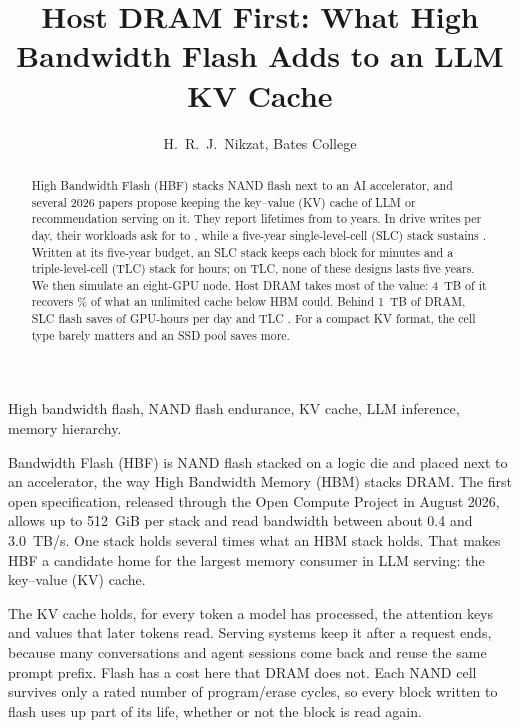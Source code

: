 \documentclass[journal]{IEEEtran}
\begin{document}

\title{Host DRAM First: What High Bandwidth Flash Adds to an LLM KV Cache}

\author{H.~R.~J.~Nikzat, Bates College}

\maketitle

\begin{abstract}
High Bandwidth Flash (HBF) stacks NAND flash next to an AI accelerator, and several 2026 papers propose keeping the key--value (KV) cache of LLM or recommendation serving on it. They report lifetimes from \RecMin{} to \RecMax{} years. In drive writes per day, their workloads ask for \RecDwpdMin{} to \RecDwpdMax{}, while a five-year single-level-cell (SLC) stack sustains \DwpdSLC{}. Written at its five-year budget, an SLC stack keeps each block for \ResSLCmin{} minutes and a triple-level-cell (TLC) stack for \ResTLCh{} hours; on TLC, none of these designs lasts five years. We then simulate an eight-GPU node. Host DRAM takes most of the value: 4~TB of it recovers \SimDramShareFour{}\% of what an unlimited cache below HBM could. Behind 1~TB of DRAM, SLC flash saves \SimRoarSLC{} of \SimNodeGPUh{} GPU-hours per day and TLC \SimRoarTLC{}. For a compact KV format, the cell type barely matters and an SSD pool saves more.
\end{abstract}

\begin{IEEEkeywords}
High bandwidth flash, NAND flash endurance, KV cache, LLM inference, memory hierarchy.
\end{IEEEkeywords}

 Bandwidth Flash (HBF) is NAND flash stacked on a logic die and placed next to an accelerator, the way High Bandwidth Memory (HBM) stacks DRAM. The first open specification, released through the Open Compute Project in August 2026, allows up to 512~GiB per stack and read bandwidth between about 0.4 and 3.0~TB/s.\cite{ocp2026hbf} One stack holds several times what an HBM stack holds. That makes HBF a candidate home for the largest memory consumer in LLM serving: the key--value (KV) cache.

The KV cache holds, for every token a model has processed, the attention keys and values that later tokens read. Serving systems keep it after a request ends, because many conversations and agent sessions come back and reuse the same prompt prefix. Flash has a cost here that DRAM does not. Each NAND cell survives only a rated number of program/erase cycles, so every block written to flash uses up part of its life, whether or not the block is read again.
\end{document}

